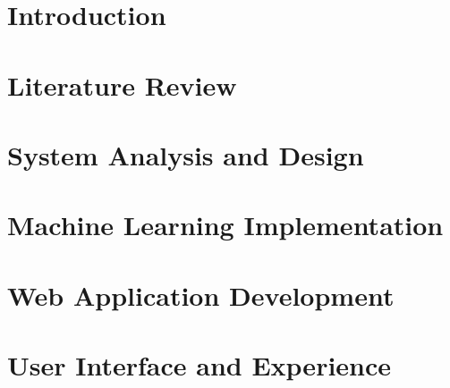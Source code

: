 \documentclass[a4paper, 12pt]{report}
\begin{document}
\newpage
{}
{}
\renewcommand{\nomname}{Symbols and Acronyms}
\printnomenclature


\newpage
{}


\chapter{Introduction}


\chapter{Literature Review}


\chapter{System Analysis and Design}


\chapter{Machine Learning Implementation}


\chapter{Web Application Development}


\chapter{User Interface and Experience}

\end{document}
